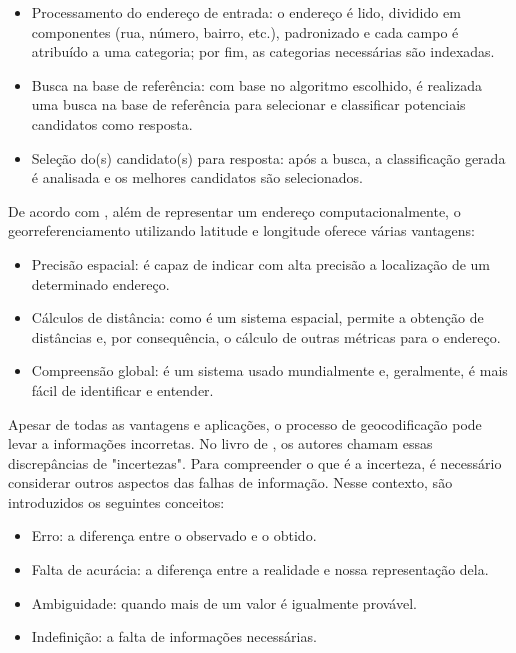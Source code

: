 \begin{itemize}
   \item Processamento do endereço de entrada: o endereço é lido, dividido em componentes (rua, número, bairro, etc.), padronizado e cada campo é atribuído a uma categoria; por fim, as categorias necessárias são indexadas.
   \item Busca na base de referência: com base no algoritmo escolhido, é realizada uma busca na base de referência para selecionar e classificar potenciais candidatos como resposta.
   \item Seleção do(s) candidato(s) para resposta: após a busca, a classificação gerada é analisada e os melhores candidatos são selecionados.
\end{itemize}

De acordo com \cite{longley2013}, além de representar um endereço computacionalmente, o georreferenciamento utilizando latitude e longitude oferece várias vantagens:

\begin{itemize}
   \item Precisão espacial: é capaz de indicar com alta precisão a localização de um determinado endereço.
   \item Cálculos de distância: como é um sistema espacial, permite a obtenção de distâncias e, por consequência, o cálculo de outras métricas para o endereço.
   \item Compreensão global: é um sistema usado mundialmente e, geralmente, é mais fácil de identificar e entender.
\end{itemize}

Apesar de todas as vantagens e aplicações, o processo de geocodificação pode levar a informações incorretas. No livro de \cite{longley2013}, os autores chamam essas discrepâncias de "incertezas". Para compreender o que é a incerteza, é necessário considerar outros aspectos das falhas de informação. Nesse contexto, são introduzidos os seguintes conceitos:

\begin{itemize}
   \item Erro: a diferença entre o observado e o obtido.
   \item Falta de acurácia: a diferença entre a realidade e nossa representação dela.
   \item Ambiguidade: quando mais de um valor é igualmente provável.
   \item Indefinição: a falta de informações necessárias.
\end{itemize}

